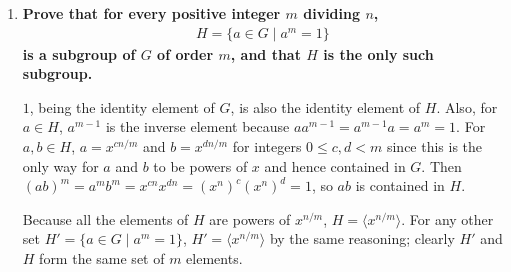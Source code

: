 \documentclass[a4paper,12pt]{article}
\begin{document}
\begin{enumerate}
\begin{enumerate}
            \item
                \iffalse
                    \boldmath
                    \textbf{Prove that for every positive integer $m$ dividing $n$, there exists a \textit{unique} subgroup of $G$ of order $m$.} \par
                    \unboldmath
                    Because every divisor of $n$ takes the form $\gcd(n, i)$ for some $i \in [0, n - 1]$, every positive integer $m$ dividing $n$ takes the form $n / \gcd(n, i)$, which is the order of $\langle x^i \rangle$ in $G$, for some $i \in [0, n - 1]$. Also, we have from (a) that every subgroup of $G$ takes the form $\langle x^i \rangle$ for some $i \in [0, n - 1]$. \par
                    This justifies us to write the following: for any positive integer $m$ dividing $n$, let $\langle x^i \rangle$ and $\langle x^j \rangle$ be two subgroups of order $m$. Because $\gcd(n, i) = \gcd(n, j) = n/m$ from part (b), $\langle x^i \rangle$ and $\langle x^j \rangle$ both take the form $\{ 1, x^{n/m}, x^{2n/m}, \cdots, x^{(m - 1)n/m} \}$, and hence $\langle x^i \rangle$ = $\langle x^j \rangle$.
                \fi
                \boldmath
                \textbf{Prove that for every positive integer $m$ dividing $n$,
                    \begin{align*}
                        H = \{ a \in G \mid a^m = 1 \}
                    \end{align*}
                is a subgroup of $G$ of order $m$, and that $H$ is the only such subgroup.} \par
                \unboldmath
                $1$, being the identity element of $G$, is also the identity element of $H$. Also, for $a \in H$, $a^{m - 1}$ is the inverse element because $a a^{m - 1} = a^{m - 1} a = a^m = 1$. For $a, b \in H$, $a = x^{cn/m}$ and $b = x^{dn/m}$ for integers $0 \leq c, d < m$ since this is the only way for $a$ and $b$ to be powers of $x$ and hence contained in $G$. Then $(ab)^m = a^m b^m = x^{cn} x^{dn} = \left( x^n \right)^c \left( x^n \right)^d = 1$, so $ab$ is contained in $H$. \par
                Because all the elements of $H$ are powers of $x^{n/m}$, $H = \langle x^{n/m} \rangle$. For any other set $H' = \{ a \in G \mid a^m = 1 \}$, $H' = \langle x^{n/m} \rangle$ by the same reasoning; clearly $H'$ and $H$ form the same set of $m$ elements.

        \end{enumerate}
\end{enumerate}
\end{document}
